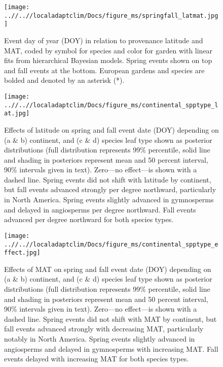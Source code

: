 \documentclass{article}
\begin{document}
\begin{figure}[!h] 
    \centering
 \texttt{[image: ..//..//localadaptclim/Docs/figure\_ms/springfall\_latmat.jpg]}
    \caption{Event day of year (DOY) in relation to provenance latitude and MAT, coded by symbol for species and color for garden with linear fits from hierarchical Bayesian models. Spring events shown on top and fall events at the bottom. European gardens and species are bolded and denoted by an asterisk (*). } 
    \label{figure:springfall_latmat}
\end{figure}

\begin{figure}[!h] 
    \centering
 \texttt{[image: ..//..//localadaptclim/Docs/figure\_ms/continental\_spptype\_lat.jpg]}
    \caption{Effects of latitude on spring and fall event date (DOY) depending on (a \& b) continent, and (c \& d) species leaf type shown as posterior distributions (full distribution represents 99\% percentile, solid line and shading in posteriors represent mean and 50 percent interval, 90\% intervals given in text). Zero---no effect---is shown with a dashed line. Spring events did not shift with latitude by continent, but fall events advanced strongly per degree northward, particularly in North America. Spring events slightly advanced in gymnosperms and delayed in angiosperms per degree northward. Fall events advanced per degree northward for both species types.}
    \label{figure:continental_spptype_lat}
\end{figure}

\begin{figure}[!h] 
    \centering
 \texttt{[image: ..//..//localadaptclim/Docs/figure\_ms/continental\_spptype\_effect.jpg]}
    \caption{Effects of MAT on spring and fall event date (DOY) depending on (a \& b) continent, and (c \& d) species leaf type shown as posterior distributions (full distribution represents 99\% percentile, solid line and shading in posteriors represent mean and 50 percent interval, 90\% intervals given in text). Zero---no effect---is shown with a dashed line. Spring events did not shift with MAT by continent, but fall events advanced strongly with decreasing MAT, particularly notably in North America. Spring events slightly advanced in angiosperms and delayed in gymnosperms with increasing MAT. Fall events delayed with increasing MAT for both species types.}
    \label{figure:continental_spptype_effect}
\end{figure}
\end{document}
